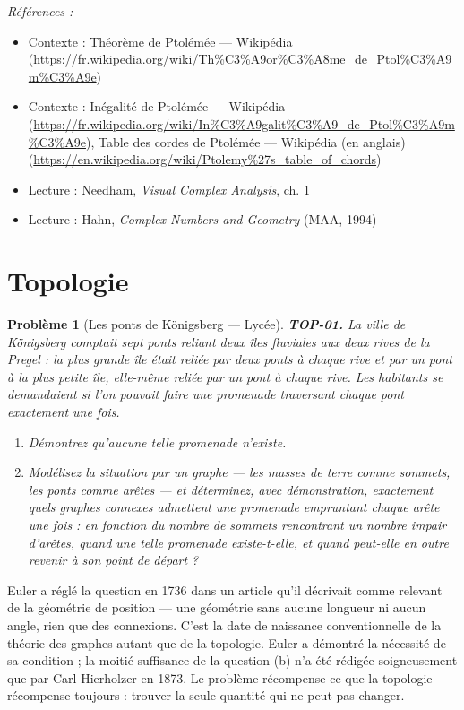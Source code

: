 \documentclass[11pt]{article}
\newtheorem{problem}{Problème}
\newenvironment{refs}{\par\small\noindent\emph{Références :}\begin{itemize}\setlength\itemsep{0pt}}{\end{itemize}\normalsize}
\begin{document}
\begin{refs}
\item Contexte : Théorème de Ptolémée --- Wikipédia (\url{https://fr.wikipedia.org/wiki/Th%C3%A9or%C3%A8me_de_Ptol%C3%A9m%C3%A9e})
\item Contexte : Inégalité de Ptolémée --- Wikipédia (\url{https://fr.wikipedia.org/wiki/In%C3%A9galit%C3%A9_de_Ptol%C3%A9m%C3%A9e}), Table des cordes de Ptolémée --- Wikipédia (en anglais) (\url{https://en.wikipedia.org/wiki/Ptolemy%27s_table_of_chords})
\item Lecture : Needham, \textit{Visual Complex Analysis}, ch. 1
\item Lecture : Hahn, \textit{Complex Numbers and Geometry} (MAA, 1994)
\end{refs}

\bigskip


\section*{Topologie}

\begin{problem}[{Les ponts de Königsberg --- Lycée}]
\textbf{TOP-01.} La ville de Königsberg comptait sept ponts reliant deux îles fluviales aux deux
rives de la Pregel : la plus grande île était reliée par deux ponts à chaque rive et par un pont à la
plus petite île, elle-même reliée par un pont à chaque rive. Les habitants se demandaient si l'on
pouvait faire une promenade traversant chaque pont exactement une fois.
\begin{enumerate}
\item[(a)] Démontrez qu'aucune telle promenade n'existe.
\item[(b)] Modélisez la situation par un graphe --- les masses de terre comme sommets, les ponts comme arêtes
--- et déterminez, avec démonstration, exactement quels graphes connexes admettent une promenade
empruntant chaque arête une fois : en fonction du nombre de sommets rencontrant un nombre impair
d'arêtes, quand une telle promenade existe-t-elle, et quand peut-elle en outre revenir à son point de
départ ?
\end{enumerate}

\end{problem}

\noindent Euler a réglé la question en 1736 dans un article qu'il décrivait comme relevant de
la \og{} géométrie de position \fg{} --- une géométrie sans aucune longueur ni aucun angle, rien que des
connexions. C'est la date de naissance conventionnelle de la théorie des graphes autant que de la
topologie. Euler a démontré la nécessité de sa condition ; la moitié \og{} suffisance \fg{} de la question (b)
n'a été rédigée soigneusement que par Carl Hierholzer en 1873. Le problème récompense ce que la
topologie récompense toujours : trouver la seule quantité qui ne peut pas changer.
\end{document}
